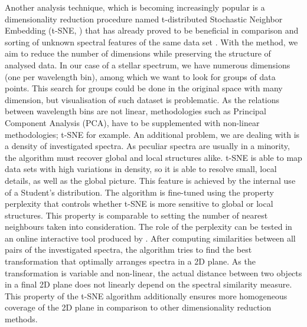 Another analysis technique, which is becoming increasingly popular is a dimensionality reduction procedure named t-distributed Stochastic Neighbor Embedding (t-SNE, \cite{van2008visualizing}) that has already proved to be beneficial in comparison and sorting of unknown spectral features of the same data set \cite{2017ApJS..228...24T}. With the method, we aim to reduce the number of dimensions while preserving the structure of analysed data. In our case of a stellar spectrum, we have numerous dimensions (one per wavelength bin), among which we want to look for groups of data points. This search for groups could be done in the original space with many dimension, but visualisation of such dataset is problematic. As the relations between wavelength bins are not linear, methodologies such as Principal Component Analysis (PCA), have to be supplemented with non-linear methodologies; t-SNE for example. An additional problem, we are dealing with is a density of investigated spectra. As peculiar spectra are usually in a minority, the algorithm must recover global and local structures alike. t-SNE is able to map data sets with high variations in density, so it is able to resolve small, local details, as well as the global picture. This feature is achieved by the internal use of a Student's distribution. The algorithm is fine-tuned using the property perplexity that controls whether t-SNE is more sensitive to global or local structures. This property is comparable to setting the number of nearest neighbours taken into consideration. The role of the perplexity can be tested in an online interactive tool produced by \citet{wattenberg2016how}. After computing similarities between all pairs of the investigated spectra, the algorithm tries to find the best transformation that optimally arranges spectra in a 2D plane. As the transformation is variable and non-linear, the actual distance between two objects in a final 2D plane does not linearly depend on the spectral similarity measure. This property of the t-SNE algorithm additionally ensures more homogeneous coverage of the 2D plane in comparison to other dimensionality reduction methods.

